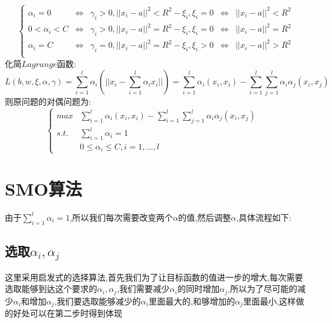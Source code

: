 \documentclass[article,12pt]{article}
\begin{document}
\begin{equation}
\left\{
\begin{array}{ccccc}
\alpha_i=0 & \Longleftrightarrow & \gamma_i > 0,||x_i-a||^2< R^2-\xi_i ,\xi_i=0&\Longleftrightarrow & ||x_i-a||^2< R^2 \\
0 <  \alpha_i < C& \Longleftrightarrow & \gamma_i > 0,||x_i-a||^2= R^2-\xi_i ,\xi_i=0&\Longleftrightarrow & ||x_i-a||^2= R^2\\
\alpha_i=C & \Longleftrightarrow & \gamma_i = 0,||x_i-a||^2= R^2-\xi_i ,\xi_i>0&\Longleftrightarrow & ||x_i-a||^2> R^2 \\
\end{array}
\right.
\end{equation}
化简$Lagrange$函数:\\
\begin{equation}
L(b,w,\xi,\alpha,\gamma)=\sum\limits_{i=1}^l\alpha_i(||x_i-\sum\limits_{i=1}^l\alpha_i x_i||)=\sum\limits_{i=1}^l \alpha_i (x_i,x_i) -\sum\limits_{i=1}^l\sum\limits_{j=1}^l \alpha_i \alpha_j(x_i,x_j)
\end{equation}
则原问题的对偶问题为:\tabularnewline
\begin{equation}
\left\{
\begin{array}{ccc}
  max & \sum\limits_{i=1}^l \alpha_i (x_i,x_i) -\sum\limits_{i=1}^l\sum\limits_{j=1}^l \alpha_i \alpha_j(x_i,x_j) &\\
  s.t. & \sum\limits_{i=1}^l \alpha_i=1&\\
      & 0\leq \alpha_i \leq C, i=1,\dots ,l
\end{array}
\right.
\end{equation}

\section{SMO算法}
由于$\sum\limits_{i=1}^l \alpha_i=1$,所以我们每次需要改变两个$\alpha$的值,然后调整$\alpha$,具体流程如下:
\subsection{选取$\alpha_i,\alpha_j$}
这里采用启发式的选择算法,首先我们为了让目标函数的值进一步的增大,每次需要选取能够到达这个要求的$\alpha_i,\alpha_j$,我们需要减少$\alpha_i$的同时增加$\alpha_j$,所以为了尽可能的减少$\alpha_i$和增加$\alpha_j$,我们要选取能够减少的$\alpha_i$里面最大的,和够增加的$\alpha_j$里面最小,这样做的好处可以在第二步时得到体现
\end{document}

